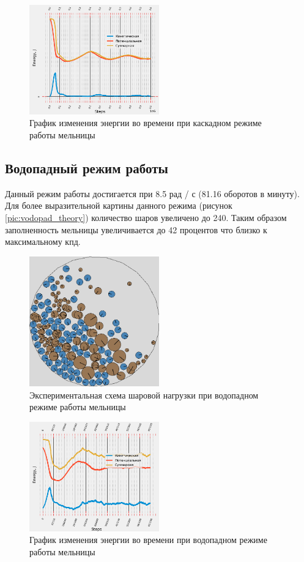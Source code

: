 \documentclass[utf8x, 14pt, oneside, a4paper]{article}
\begin{document}
\begin{figure}[H]
	\centering
	\includegraphics[width=0.5\textwidth]{kaskad_energy}
	\caption{График изменения энергии во времени при каскадном режиме работы мельницы}
	\label{pic:kaskad_energy}
\end{figure} 

\subsection{Водопадный режим работы}

Данный режим работы достигается при 8.5 рад / с (81.16 оборотов в минуту).
Для более выразительной картины данного режима (рисунок \ref{pic:vodopad_theory}) количество шаров увеличено до 240. 
Таким образом заполненность мельницы увеличивается до 42 процентов что близко к максимальному кпд. 

\begin{figure}[H]
	\centering
	\includegraphics[width=0.5\textwidth]{vodopad_result} 
	\caption{Экспериментальная схема шаровой нагрузки при водопадном режиме работы мельницы}
	\label{pic:vodopad_result}
\end{figure} 

\begin{figure}[H]
	\centering
	\includegraphics[width=0.5\textwidth]{vodopad_energy} 
	\caption{График изменения энергии во времени при водопадном режиме работы мельницы}
	\label{pic:vodopad_energy}
\end{figure} 
\end{document}
